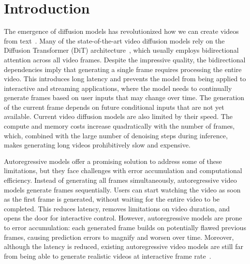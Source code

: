 \section{Introduction}
\label{sec:intro}
The emergence of diffusion models has revolutionized how we can create videos from text~\cite{opensora,videoworldsimulators2024,jin2024pyramidal,yang2024cogvideox,polyak2024movie,ho2022video,blattmann2023stable}.
Many of the state-of-the-art video diffusion models rely on the Diffusion Transformer (DiT) architecture~\cite{peebles2023scalable,bao2022all}, which usually employs bidirectional attention across all video frames. 
Despite the impressive quality, the bidirectional dependencies imply that generating a single frame requires processing the entire video.
This introduces long latency and prevents the model from being applied to interactive and streaming applications, where the model needs to continually generate frames based on user inputs that may change over time. 
The generation of the current frame depends on future conditional inputs that are not yet available.
Current video diffusion models are also limited by their speed.
The compute and memory costs increase quadratically with the number of frames, which, combined with the large number of denoising steps during inference, makes generating long videos prohibitively slow and expensive.

Autoregressive models offer a promising solution to address some of these limitations, but they face challenges with error accumulation and computational efficiency.
Instead of generating all frames simultaneously, autoregressive video models generate frames sequentially. 
Users can start watching the video as soon as the first frame is generated, without waiting for the entire video to be completed. This reduces latency, removes limitations on video duration, and opens the door for interactive control.
However, autoregressive models are prone to error accumulation: each generated frame builds on potentially flawed previous frames, causing prediction errors to magnify and worsen over time.
Moreover, although the latency is reduced, existing autoregressive video models are still far from being able to generate realistic videos at interactive frame rate~\cite{jin2024pyramidal,kondratyuk2023videopoet,che2024gamegen}.

